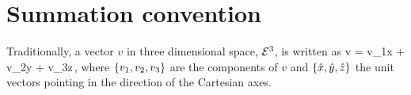 \section{Summation convention}
Traditionally, a vector $v$ in three dimensional space, $\mathcal{\mathcal{E}}^{3}$, is written as
\beq
v = v_1\hat x + v_2\hat y + v_3\hat z\,,
\eeq
where $\left\lbrace{v_1, v_2, v_3}\right\rbrace$ are the components of $v$ and $\left\lbrace{\hat x, \hat y, \hat z}\right\rbrace$ the unit vectors pointing in the direction of the Cartesian axes.



